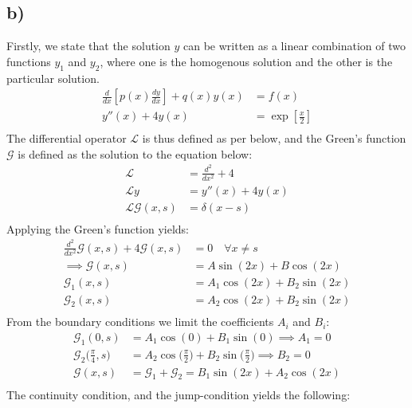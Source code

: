 \documentclass{article}
\begin{document}
\subsection*{b)}
Firstly, we state that the solution $y$ can be written as a linear combination of two functions $y_1$ and $y_2$, where one is the homogenous solution and the other is the particular solution.
\begin{align*}
    \frac{d}{dx}\left[p(x)\frac{dy}{dx}\right] + q(x)y(x) &= f(x)\\
    y''(x) + 4y(x) &= \exp\left[\frac{x}{2}\right]\\
\end{align*}The differential operator $\mathcal{L}$ is thus defined as per below, and the Green's function $\mathcal{G}$ is defined as the solution to the equation below:
\begin{align*}
    \mathcal{L} &= \frac{d^2}{dx^2} + 4\\
    \mathcal{L}y &= y''(x) + 4y(x)\\
    \mathcal{L}\mathcal{G}(x, s) &= \delta(x - s)\\
\end{align*}Applying the Green's function yields:
\begin{align*}
    \frac{d^2}{dx^2}\mathcal{G}(x,s) + 4\mathcal{G}(x,s) &= 0\quad \forall x\neq s\\
    \implies \mathcal{G}(x,s) &= A\sin(2x) + B\cos(2x)\\
    \mathcal{G}_1(x,s) &= A_1\cos(2x) + B_2\sin(2x)\\
    \mathcal{G}_2(x,s) &= A_2\cos(2x) + B_2\sin(2x)\\
\end{align*}From the boundary conditions we limit the coefficients $A_i$ and $B_i$:
\begin{align*}
    \mathcal{G}_1(0,s) &= A_1\cos(0) + B_1\sin(0)\implies A_1 = 0\\
    \mathcal{G}_2\Big(\frac{\pi}{4},s\Big) &= A_2\cos\Big(\frac{\pi}{2}\Big) + B_2\sin\Big(\frac{\pi}{2}\Big)\implies B_2 = 0\\
    \mathcal{G}(x,s) &= \mathcal{G}_1 +\mathcal{G}_2 = B_1\sin(2x) + A_2\cos(2x)\\
\end{align*}The continuity condition, and the jump-condition yields the following:
\end{document}
